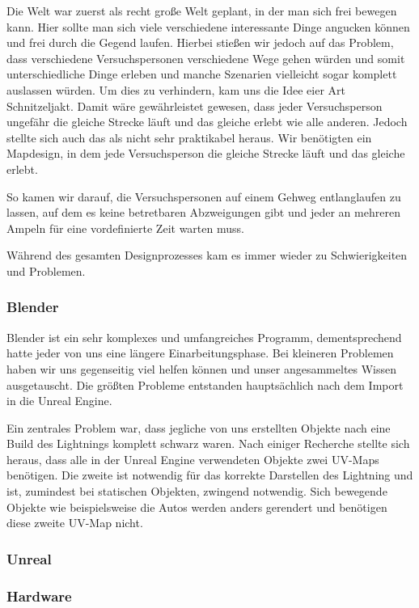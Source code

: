 \documentclass{Bericht}
\begin{document}
		Die Welt war zuerst als recht große Welt geplant, in der man sich frei bewegen kann. Hier sollte man sich viele verschiedene interessante Dinge angucken können und frei durch die Gegend laufen. Hierbei stießen wir jedoch auf das Problem, dass verschiedene Versuchspersonen verschiedene Wege gehen würden und somit unterschiedliche Dinge erleben und manche Szenarien vielleicht sogar komplett auslassen würden. Um dies zu verhindern, kam uns die Idee eier Art Schnitzeljakt. Damit wäre gewährleistet gewesen, dass jeder Versuchsperson ungefähr die gleiche Strecke läuft und das gleiche erlebt wie alle anderen. Jedoch stellte sich auch das als nicht sehr praktikabel heraus. Wir benötigten ein Mapdesign, in dem jede Versuchsperson die gleiche Strecke läuft und das gleiche erlebt.

		So kamen wir darauf, die Versuchspersonen auf einem Gehweg entlanglaufen zu lassen, auf dem es keine betretbaren Abzweigungen gibt und jeder an mehreren Ampeln für eine vordefinierte Zeit warten muss. 
		
		Während des gesamten Designprozesses kam es immer wieder zu Schwierigkeiten und Problemen.
		
		\subsubsection{Blender}
			Blender ist ein sehr komplexes und umfangreiches Programm, dementsprechend hatte jeder von uns eine längere Einarbeitungsphase. Bei kleineren Problemen haben wir uns gegenseitig viel helfen können und unser angesammeltes Wissen ausgetauscht. Die größten Probleme entstanden hauptsächlich nach dem Import in die Unreal Engine. 
			
			Ein zentrales Problem war, dass jegliche von uns erstellten Objekte nach eine Build des Lightnings komplett schwarz waren. Nach einiger Recherche stellte sich heraus, dass alle in der Unreal Engine verwendeten Objekte zwei UV-Maps benötigen. Die zweite ist notwendig für das korrekte Darstellen des Lightning und ist, zumindest bei statischen Objekten, zwingend notwendig. Sich bewegende Objekte wie beispielsweise die Autos werden anders gerendert und benötigen diese zweite UV-Map nicht. 
		
		\subsubsection{Unreal}
		
		\subsubsection{Hardware}
		
\end{document}
